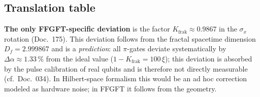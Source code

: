 \subsection{Translation table}

\begin{center}
\renewcommand{\arraystretch}{1.4}
{\small
{}
}
\renewcommand{\arraystretch}{1.0}
\end{center}

\textbf{The only FFGFT-specific deviation} is the factor
$K_{\text{frak}} \approx 0.9867$ in the $\sigma_x$ rotation
(Doc.~175). This deviation follows from the fractal spacetime
dimension $D_f = 2.999867$ and is a \emph{prediction}: all
$\pi$-gates deviate systematically by $\Delta\alpha \approx 1.33\,\%$
from the ideal value ($1-K_{\text{frak}} = 100\,\xi$); this deviation is
absorbed by the pulse calibration of real qubits and is therefore not
directly measurable (cf.\ Doc.~034). In Hilbert-space formalism this would be an
ad hoc correction modeled as hardware noise; in FFGFT it follows
from the geometry.

